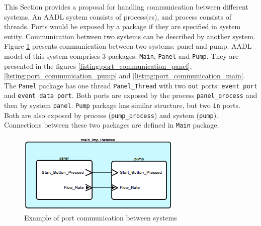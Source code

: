 This Section provides a proposal for handling communication between different systems. An AADL system consists of process(es), and process consists of threads. Ports would be exposed by a package if they are specified in system entity. Communication between two systems can be described by another system. Figure \ref{figure:port_communication} presents communication between two systems: panel and pump. AADL model of this system comprises 3 packages: \lstinline{Main}, \lstinline{Panel} and \lstinline{Pump}. They are presented in the figures \ref{listing:port_communication_panel}, \ref{listing:port_communication_pump} and \ref{listing:port_communication_main}. The \lstinline{Panel} package has one thread \lstinline{Panel_Thread} with two \lstinline{out} ports: \lstinline{event port} and \lstinline{event data port}. Both ports are exposed by the process \lstinline{panel_process} and then by system \lstinline{panel}. \lstinline{Pump} package has similar structure, but two \lstinline{in} ports. Both are also exposed by process (\lstinline{pump_process}) and system (\lstinline{pump}). Connections between these two packages are defined in \lstinline{Main} package.

\begin{figure}[h] %
    \begin{center}
    	\includegraphics[width=0.7\textwidth]{figures/port-communication.png}    	
    \end{center}
    \caption{Example of port communication between systems}
    \label{figure:port_communication}
\end{figure}

